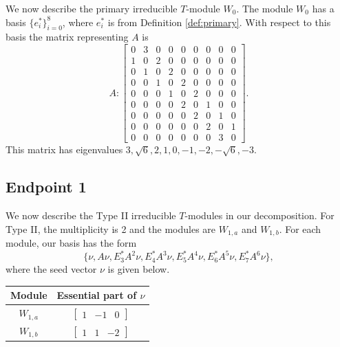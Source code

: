 \documentclass[12pt,letterpaper]{article}
\newcommand{\rowvector}[1]{\begin{bmatrix} #1 \end{bmatrix}}
\begin{document}
We now describe the primary irreducible $T$-module $W_0$. The module $W_0$ has a basis $\{e_i^*\}_{i=0}^8$, where $e_i^*$ is from Definition \ref{def:primary}. With respect to this basis the matrix representing $A$ is
\begin{equation}
    A: \begin{bmatrix}
  0 & 3 & 0 & 0 & 0 & 0 & 0 & 0 & 0 \\
  1 & 0 & 2 & 0 & 0 & 0 & 0 & 0 & 0 \\
  0 & 1 & 0 & 2 & 0 & 0 & 0 & 0 & 0 \\
  0 & 0 & 1 & 0 & 2 & 0 & 0 & 0 & 0 \\
  0 & 0 & 0 & 1 & 0 & 2 & 0 & 0 & 0 \\
  0 & 0 & 0 & 0 & 2 & 0 & 1 & 0 & 0 \\
  0 & 0 & 0 & 0 & 0 & 2 & 0 & 1 & 0 \\
  0 & 0 & 0 & 0 & 0 & 0 & 2 & 0 & 1 \\
  0 & 0 & 0 & 0 & 0 & 0 & 0 & 3 & 0 \end{bmatrix}.
\label{eq:fos-I}
\end{equation}
This matrix has eigenvalues $3, \sqrt{6}, 2, 1, 0, -1, -2, -\sqrt{6}, -3$.

\subsection{Endpoint 1}

We now describe the Type II irreducible $T$-modules in our decomposition. For Type II, the multiplicity is 2 and the modules are $W_{1,a}$ and $W_{1,b}$. For each module, our basis has the form 
\begin{equation*}
    \{\nu, A\nu, E_3^*A^2\nu, E_4^*A^3\nu, E_5^*A^4\nu, E_6^*A^5\nu, E_7^*A^6\nu\},
\end{equation*} 
where the seed vector $\nu$ is given below.
\begin{center}
    \begin{tabular}{c | c}
    \toprule
       \textbf{Module}  & \textbf {Essential part of }$\nu$ \\
       \midrule
       $W_{1,a}$  & $\rowvector{1 & -1 & 0}$ \\[1.67pt]
       $W_{1,b}$  & $\rowvector{1 & 1 & -2}$ \\
    \bottomrule
    \end{tabular}
\end{center}
\end{document}
